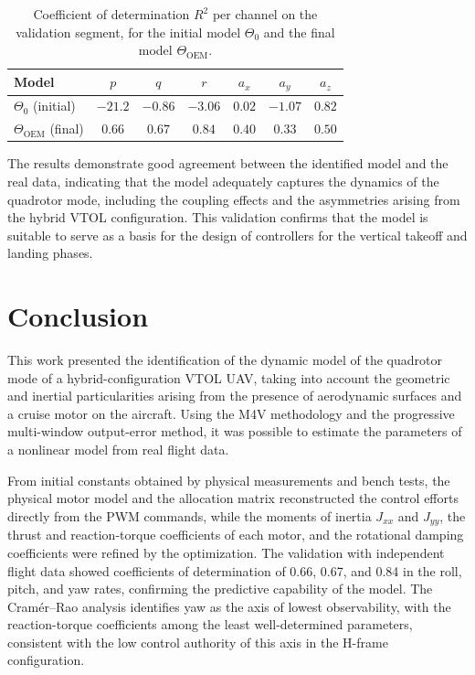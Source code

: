 \documentclass{ieeeaccess}
\begin{document}
\begin{table}[!htbp]
\caption{Coefficient of determination $R^2$ per channel on the validation segment, for the initial model {$\Theta_0$} and the final model {$\Theta_{\text{OEM}}$}.}
\label{tab:r2_val}
\centering
\begin{tabular}{lcccccc}
\toprule
\textbf{Model} & $p$ & $q$ & $r$ & $a_x$ & $a_y$ & $a_z$ \\
\midrule
$\Theta_0$ (initial) & $-21.2$ & $-0.86$ & $-3.06$ & $0.02$ & $-1.07$ & $0.82$ \\
$\Theta_{\text{OEM}}$ (final) & $0.66$ & $0.67$ & $0.84$ & $0.40$ & $0.33$ & $0.50$ \\
\bottomrule
\end{tabular}
\end{table}

The results demonstrate good agreement between the identified model and the real data, indicating that the model adequately captures the dynamics of the quadrotor mode, including the coupling effects and the asymmetries arising from the hybrid VTOL configuration. This validation confirms that the model is suitable to serve as a basis for the design of controllers for the vertical takeoff and landing phases.

\section{Conclusion}
\label{sec:conclusao}

This work presented the identification of the dynamic model of the quadrotor mode of a hybrid-configuration VTOL UAV, taking into account the geometric and inertial particularities arising from the presence of aerodynamic surfaces and a cruise motor on the aircraft. Using the M4V methodology and the progressive multi-window output-error method, it was possible to estimate the parameters of a nonlinear model from real flight data.

From initial constants obtained by physical measurements and bench tests, the physical motor model and the allocation matrix reconstructed the control efforts directly from the PWM commands, while the moments of inertia $J_{xx}$ and $J_{yy}$, the thrust and reaction-torque coefficients of each motor, and the rotational damping coefficients were refined by the optimization. The validation with independent flight data showed coefficients of determination of 0.66, 0.67, and 0.84 in the roll, pitch, and yaw rates, confirming the predictive capability of the model. The Cramér--Rao analysis identifies yaw as the axis of lowest observability, with the reaction-torque coefficients among the least well-determined parameters, consistent with the low control authority of this axis in the H-frame configuration.
\end{document}
